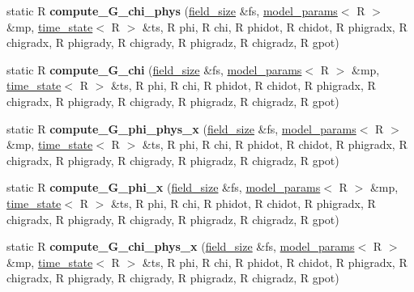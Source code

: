 \begin{DoxyCompactItemize}
\item 
\hypertarget{structgrid__funcs_a517079423086048162b1f9eba0c140e1}{
static R {\bfseries compute\_\-G\_\-chi\_\-phys} (\hyperlink{structfield__size}{field\_\-size} \&fs, \hyperlink{structmodel__params}{model\_\-params}$<$ R $>$ \&mp, \hyperlink{structtime__state}{time\_\-state}$<$ R $>$ \&ts, R phi, R chi, R phidot, R chidot, R phigradx, R chigradx, R phigrady, R chigrady, R phigradz, R chigradz, R gpot)}
\label{structgrid__funcs_a517079423086048162b1f9eba0c140e1}

\item 
\hypertarget{structgrid__funcs_a83a9815afe5d0f3db972f3397598dac8}{
static R {\bfseries compute\_\-G\_\-chi} (\hyperlink{structfield__size}{field\_\-size} \&fs, \hyperlink{structmodel__params}{model\_\-params}$<$ R $>$ \&mp, \hyperlink{structtime__state}{time\_\-state}$<$ R $>$ \&ts, R phi, R chi, R phidot, R chidot, R phigradx, R chigradx, R phigrady, R chigrady, R phigradz, R chigradz, R gpot)}
\label{structgrid__funcs_a83a9815afe5d0f3db972f3397598dac8}

\item 
\hypertarget{structgrid__funcs_a159216a09f09382cfe691ae866d1c47c}{
static R {\bfseries compute\_\-G\_\-phi\_\-phys\_\-x} (\hyperlink{structfield__size}{field\_\-size} \&fs, \hyperlink{structmodel__params}{model\_\-params}$<$ R $>$ \&mp, \hyperlink{structtime__state}{time\_\-state}$<$ R $>$ \&ts, R phi, R chi, R phidot, R chidot, R phigradx, R chigradx, R phigrady, R chigrady, R phigradz, R chigradz, R gpot)}
\label{structgrid__funcs_a159216a09f09382cfe691ae866d1c47c}

\item 
\hypertarget{structgrid__funcs_a004819190ddf49ed85060c477233e3fc}{
static R {\bfseries compute\_\-G\_\-phi\_\-x} (\hyperlink{structfield__size}{field\_\-size} \&fs, \hyperlink{structmodel__params}{model\_\-params}$<$ R $>$ \&mp, \hyperlink{structtime__state}{time\_\-state}$<$ R $>$ \&ts, R phi, R chi, R phidot, R chidot, R phigradx, R chigradx, R phigrady, R chigrady, R phigradz, R chigradz, R gpot)}
\label{structgrid__funcs_a004819190ddf49ed85060c477233e3fc}

\item 
\hypertarget{structgrid__funcs_af37ef70b6b0599e8fdaaa4c431808bf3}{
static R {\bfseries compute\_\-G\_\-chi\_\-phys\_\-x} (\hyperlink{structfield__size}{field\_\-size} \&fs, \hyperlink{structmodel__params}{model\_\-params}$<$ R $>$ \&mp, \hyperlink{structtime__state}{time\_\-state}$<$ R $>$ \&ts, R phi, R chi, R phidot, R chidot, R phigradx, R chigradx, R phigrady, R chigrady, R phigradz, R chigradz, R gpot)}
\label{structgrid__funcs_af37ef70b6b0599e8fdaaa4c431808bf3}


\end{DoxyCompactItemize}
